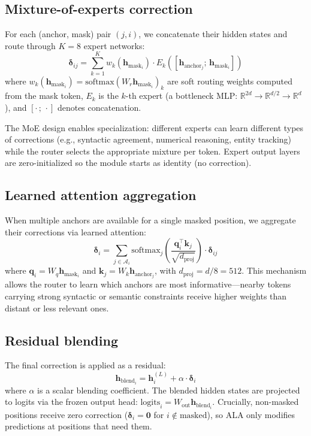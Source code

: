 \documentclass{article} %
\newcommand{\hmask}{\mathbf{h}_{\text{mask}}}
\newcommand{\hanchor}{\mathbf{h}_{\text{anchor}}}
\newcommand{\hblend}{\mathbf{h}_{\text{blend}}}
\newcommand{\deltaH}{\boldsymbol{\delta}}
\begin{document}
\subsection{Mixture-of-experts correction}

For each (anchor, mask) pair $(j, i)$, we concatenate their hidden states and route through $K{=}8$ expert networks:
\begin{equation}
    \deltaH_{ij} = \sum_{k=1}^{K} w_k(\hmask_i) \cdot E_k([\hanchor_j;\, \hmask_i])
    \label{eq:moe}
\end{equation}
where $w_k(\hmask_i) = \text{softmax}(W_r \hmask_i)_k$ are soft routing weights computed from the mask token, $E_k$ is the $k$-th expert (a bottleneck MLP: $\mathbb{R}^{2d} \to \mathbb{R}^{d/2} \to \mathbb{R}^{d}$), and $[\cdot\,;\,\cdot]$ denotes concatenation.

The MoE design enables specialization: different experts can learn different types of corrections (e.g., syntactic agreement, numerical reasoning, entity tracking) while the router selects the appropriate mixture per token.
Expert output layers are zero-initialized so the module starts as identity (no correction).

\subsection{Learned attention aggregation}

When multiple anchors are available for a single masked position, we aggregate their corrections via learned attention:
\begin{equation}
    \deltaH_i = \sum_{j \in \mathcal{A}_i} \text{softmax}_j\!\left(\frac{\mathbf{q}_i^\top \mathbf{k}_j}{\sqrt{d_{\text{proj}}}}\right) \cdot \deltaH_{ij}
    \label{eq:attn}
\end{equation}
where $\mathbf{q}_i = W_q \hmask_i$ and $\mathbf{k}_j = W_k \hanchor_j$, with $d_{\text{proj}} = d/8 = 512$.
This mechanism allows the router to learn which anchors are most informative---nearby tokens carrying strong syntactic or semantic constraints receive higher weights than distant or less relevant ones.

\subsection{Residual blending}

The final correction is applied as a residual:
\begin{equation}
    \hblend_i = \mathbf{h}_i^{(L)} + \alpha \cdot \deltaH_i
    \label{eq:blend}
\end{equation}
where $\alpha$ is a scalar blending coefficient.
The blended hidden states are projected to logits via the frozen output head: $\text{logits}_i = W_{\text{out}} \hblend_i$.
Crucially, non-masked positions receive zero correction ($\deltaH_i = \mathbf{0}$ for $i \notin \text{masked}$), so ALA only modifies predictions at positions that need them.
\end{document}
